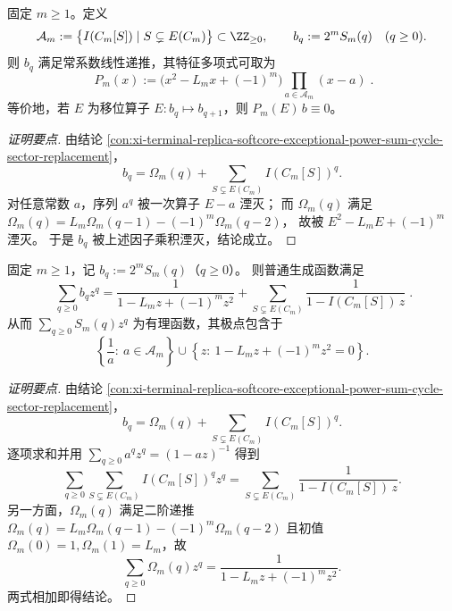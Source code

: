 \begin{conclusion}\label{con:xi-terminal-replica-softcore-q-recurrence-characteristic-upper-bound}
固定 \(m\ge 1\)。定义
\[
\mathcal A_m:=\bigl\{I(C_m[S])\mid S\subsetneq E(C_m)\bigr\}\subset\ZZ_{\ge0},
\qquad
b_q:=2^mS_m(q)\quad(q\ge0).
\]
则 \(b_q\) 满足常系数线性递推，其特征多项式可取为
\[
\boxed{\;
P_m(x):=\bigl(x^2-L_mx+(-1)^m\bigr)\prod_{a\in\mathcal A_m}(x-a)\; } .
\]
等价地，若 \(E\) 为移位算子 \(E:b_q\mapsto b_{q+1}\)，则 \(P_m(E)\,b\equiv0\)。
\end{conclusion}
\begin{proof}[证明要点]
由结论 \ref{con:xi-terminal-replica-softcore-exceptional-power-sum-cycle-sector-replacement}，
\[
b_q=\Omega_m(q)+\sum_{S\subsetneq E(C_m)}I(C_m[S])^q.
\]
对任意常数 \(a\)，序列 \(a^q\) 被一次算子 \(E-a\) 湮灭；
而 \(\Omega_m(q)\) 满足
\(
\Omega_m(q)=L_m\Omega_m(q-1)-(-1)^m\Omega_m(q-2)
\)，
故被 \(E^2-L_mE+(-1)^m\) 湮灭。
于是 \(b_q\) 被上述因子乘积湮灭，结论成立。
\end{proof}
\begin{conclusion}\label{con:xi-terminal-replica-softcore-q-ordinary-genfunc-partial-fractions}
固定 \(m\ge 1\)，记 \(b_q:=2^mS_m(q)\)（\(q\ge0\)）。
则普通生成函数满足
\[
\boxed{\;
\sum_{q\ge0}b_qz^q
=\frac{1}{1-L_m z+(-1)^m z^2}
+\sum_{S\subsetneq E(C_m)}\frac{1}{1-I(C_m[S])\,z}\; } .
\]
从而 \(\sum_{q\ge0}S_m(q)z^q\) 为有理函数，其极点包含于
\[
\left\{\frac1a:\ a\in\mathcal A_m\right\}
\cup
\left\{z:\ 1-L_m z+(-1)^m z^2=0\right\}.
\]
\end{conclusion}
\begin{proof}[证明要点]
由结论 \ref{con:xi-terminal-replica-softcore-exceptional-power-sum-cycle-sector-replacement}，
\[
b_q=\Omega_m(q)+\sum_{S\subsetneq E(C_m)}I(C_m[S])^q.
\]
逐项求和并用
\(
\sum_{q\ge0}a^qz^q=(1-az)^{-1}
\)
得到
\[
\sum_{q\ge0}\sum_{S\subsetneq E(C_m)}I(C_m[S])^qz^q
=\sum_{S\subsetneq E(C_m)}\frac{1}{1-I(C_m[S])\,z}.
\]
另一方面，\(\Omega_m(q)\) 满足二阶递推
\(
\Omega_m(q)=L_m\Omega_m(q-1)-(-1)^m\Omega_m(q-2)
\)
且初值 \(\Omega_m(0)=1,\Omega_m(1)=L_m\)，故
\[
\sum_{q\ge0}\Omega_m(q)z^q=\frac{1}{1-L_m z+(-1)^m z^2}.
\]
两式相加即得结论。
\end{proof}







